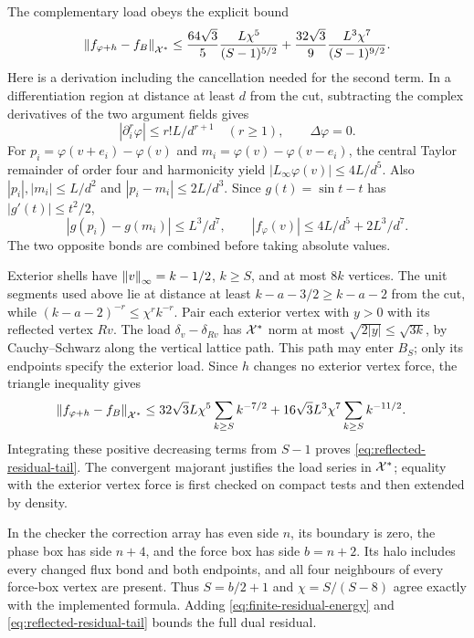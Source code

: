 The complementary load obeys the explicit bound
\begin{equation}
 \left\lVert f_{\varphi+h}-f_B\right\rVert_{\mathcal X^*}
 \le \frac{64\sqrt3}{5}\frac{L\chi^5}{(S-1)^{5/2}}
      +\frac{32\sqrt3}{9}\frac{L^3\chi^7}{(S-1)^{9/2}}.
 \label{eq:reflected-residual-tail}
\end{equation}
Here is a derivation including the cancellation needed for the second
term. In a differentiation region at distance at least $d$ from the cut,
subtracting the complex derivatives of the two argument fields gives
\[
 |\partial_i^r\varphi|\le r!L/d^{r+1}\quad(r\ge1),
 \qquad \Delta\varphi=0.
\]
For $p_i=\varphi(v+e_i)-\varphi(v)$ and
$m_i=\varphi(v)-\varphi(v-e_i)$, the central Taylor remainder of order
four and harmonicity yield $|L_\infty\varphi(v)|\le4L/d^5$.
Also $|p_i|,|m_i|\le L/d^2$ and $|p_i-m_i|\le2L/d^3$.
Since $g(t)=\sin t-t$ has $|g'(t)|\le t^2/2$,
\[
 |g(p_i)-g(m_i)|\le L^3/d^7,\qquad
 |f_\varphi(v)|\le4L/d^5+2L^3/d^7.
\]
The two opposite bonds are combined before taking absolute values.

Exterior shells have $\left\lVert v\right\rVert_\infty=k-1/2$, $k\ge S$, and at most
$8k$ vertices. The unit segments used above lie at distance at least
$k-a-3/2\ge k-a-2$ from the cut, while
$(k-a-2)^{-r}\le\chi^r k^{-r}$. Pair each exterior vertex with $y>0$
with its reflected vertex $Rv$. The load $\delta_v-\delta_{Rv}$ has
$\mathcal X^*$ norm at most $\sqrt{2|y|}\le\sqrt{3k}$, by Cauchy--Schwarz
along the vertical lattice path. This path may enter $B_S$; only its
endpoints specify the exterior load. Since $h$ changes no exterior
vertex force, the triangle inequality gives
\begin{align*}
 \left\lVert f_{\varphi+h}-f_B\right\rVert_{\mathcal X^*}
 &\le32\sqrt3 L\chi^5\sum_{k\ge S}k^{-7/2}
       +16\sqrt3 L^3\chi^7\sum_{k\ge S}k^{-11/2}.
\end{align*}
Integrating these positive decreasing terms from $S-1$ proves
\eqref{eq:reflected-residual-tail}. The convergent majorant justifies
the load series in $\mathcal X^*$; equality with the exterior vertex force is
first checked on compact tests and then extended by density.

In the checker the correction array has even side $n$, its boundary
is zero, the phase box has side $n+4$, and the force box has side
$b=n+2$. Its halo includes every changed flux bond and both endpoints,
and all four neighbours of every force-box vertex are present.
Thus $S=b/2+1$ and $\chi=S/(S-8)$ agree exactly with the implemented
formula. Adding \eqref{eq:finite-residual-energy} and
\eqref{eq:reflected-residual-tail} bounds the full dual residual.
